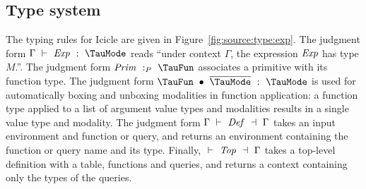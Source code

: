 






\subsection{Type system}
The typing rules for Icicle are given in Figure~\ref{fig:source:type:exp}.
The judgment form $\Typecheck{\Gamma}{\mi{Exp}}{\TauMode}$ reads ``under context $\Gamma$, the expression $\mathit{Exp}$ has type $M$.''. 
The judgment form $\TypecheckP{\mi{Prim}}{\TauFun}$ associates a primitive with its function type.
The judgment form $\TypecheckApp{\TauFun}{\ov{\TauMode}}{\TauMode}$ is used for automatically boxing and unboxing modalities in function application: a function type applied to a list of argument value types and modalities results in a single value type and modality.
The judgment form $\TypecheckS{\Gamma}{\mi{Def}}{\Gamma}$ takes an input environment and function or query, and returns an environment containing the function or query name and its type.
Finally, $\TypecheckS{}{\mi{Top}}{\Gamma}$ takes a top-level definition with a table, functions and queries, and returns a context containing only the types of the queries.

